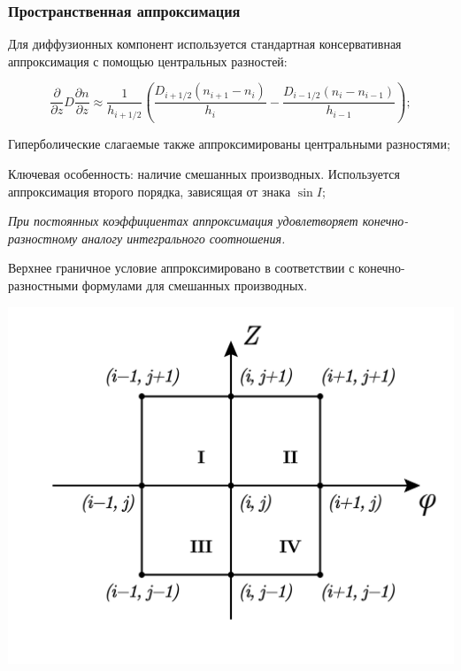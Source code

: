 \documentclass[9pt, apectratio=43,unicode]{beamer}
\begin{document}
\begin{frame}\frametitle{Пространственная аппроксимация}
\begin{itemize}
\item[•] Для диффузионных компонент используется стандартная консервативная аппроксимация с помощью центральных разностей:

$$\dfrac{\partial}{\partial z}D\dfrac{\partial n}{\partial z} \approx \dfrac{1}{h_{i+1/2}}\left(\dfrac{D_{i+1/2}(n_{i+1}-n_i)}{h_i}-\dfrac{D_{i-1/2}(n_{i}-n_{i-1})}{h_{i-1}}\right);$$

\item[•] Гиперболические слагаемые также аппроксимированы центральными разностями;


\parbox[b][5cm][t]{50mm}{
\item[•] Ключевая особенность: наличие смешанных производных. Используется аппроксимация второго порядка, зависящая от знака $\sin I$;

{\small\textit{При постоянных коэффициентах аппроксимация удовлетворяет конечно-разностному аналогу интегрального соотношения.}}

\item[•] Верхнее граничное условие аппроксимировано в соответствии с конечно-разностными формулами для смешанных производных.
}
\hfill
\parbox[b][5cm][t]{60mm}{
\includegraphics[scale = 0.3]{square}
}

\end{itemize}

\end{frame}
\end{document}
